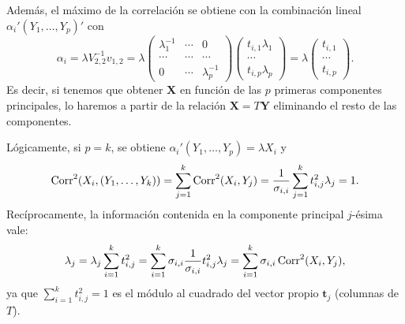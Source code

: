 Además, el máximo de la correlación se obtiene con la combinación lineal $\alpha_i'(Y_1,\dots,Y_p)'$ con \[ \alpha_i=\lambda V_{2,2}^{-1}v_{1,2}=\lambda\begin{pmatrix}
	\lambda_1^{-1} & \cdots & 0\\
	\cdots & \cdots & \cdots\\
	0 & \cdots & \lambda_p^{-1}
\end{pmatrix}\begin{pmatrix}
t_{i,1}\lambda_1\\
\cdots\\
t_{i,p}\lambda_p
\end{pmatrix}=\lambda\begin{pmatrix}
t_{i,1}\\
\cdots\\
t_{i,p}
\end{pmatrix}. \]
Es decir, si tenemos que obtener $\mathbf{X}$ en función de las $p$ primeras componentes principales, lo haremos a partir de la relación $\mathbf{X}=T\mathbf{Y}$ eliminando el resto de las componentes.

Lógicamente, si $p=k$, se obtiene $\alpha_i'(Y_1,\dots,Y_p)=\lambda X_i$ y \[ \operatorname{Corr}^2(X_i,(Y_1,\dots,Y_k))=\sum_{j=1}^{k}\operatorname{Corr}^2(X_i,Y_j)=\dfrac{1}{\sigma_{i,i}}\sum_{j=1}^{k}t_{i,j}^2\lambda_j=1. \]
Recíprocamente, la información contenida en la componente principal $j$-ésima vale: \[ \lambda_j=\lambda_j\sum_{i=1}^{k}t_{i,j}^2=\sum_{i=1}^{k}\sigma_{i,i}\dfrac{1}{\sigma_{i,i}}t_{i,j}^2\lambda_j=\sum_{i=1}^{k}\sigma_{i,i}\operatorname{Corr}^2(X_i,Y_j), \] ya que $\sum_{i=1}^{k}t_{i,j}^2=1$ es el módulo al cuadrado del vector propio $\mathbf{t}_j$ (columnas de $T$).

